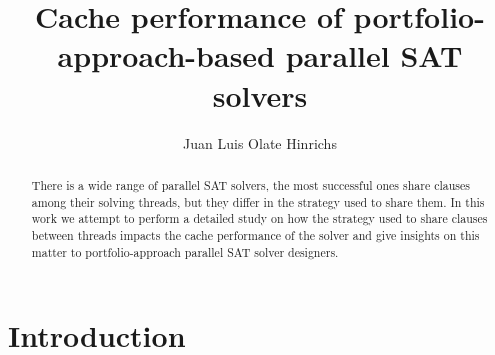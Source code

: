 \documentclass[12pt]{diicc}
\title{\bf Cache performance of portfolio-approach-based parallel SAT solvers}
\author{Juan Luis Olate Hinrichs}
\begin{document}
\frontmatter

%


%
\begin{abstract}
There is a wide range of parallel SAT solvers, the most successful ones share clauses among their solving threads, but they differ in the strategy used to share them. In this work we attempt to perform a detailed study on how the strategy used to share clauses between threads impacts the cache performance of the solver and give insights on this matter to portfolio-approach parallel SAT solver designers. 
\end{abstract}

%
% 
\mainmatter
\chapter{Introduction}\label{chap:intro}
\end{document}
